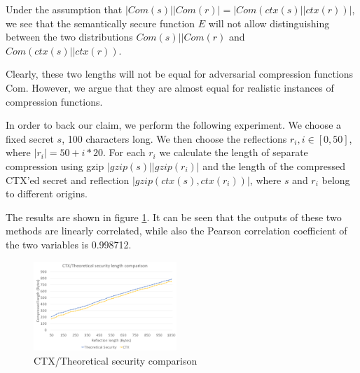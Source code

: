 Under the assumption that $|Com(s) || Com(r)| = |Com(ctx(s) || ctx(r))|$, we
see that the semantically secure function $E$ will not allow distinguishing
between the two distributions $Com(s) || Com(r)$ and $Com(ctx(s) || ctx(r))$.

Clearly, these two lengths will not be equal for adversarial compression
functions Com. However, we argue that they are almost equal for realistic
instances of compression functions.

In order to back our claim, we perform the following experiment. We choose a
fixed secret $s$, 100 characters long. We then choose the reflections $r_i,
i\in[0, 50]$, where $|r_i| = 50 + i*20$. For each $r_i$ we calculate the
length of separate compression using gzip $|gzip(s)||gzip(r_i)|$ and the length
of the compressed CTX'ed secret and reflection $|gzip(ctx(s), ctx(r_i))|$, where $s$
and $r_i$ belong to different origins.

The results are shown in figure \ref{fig:defense_experiment}. It can be seen
that the outputs of these two methods are linearly correlated, while also the
Pearson correlation coefficient of the two variables is 0.998712.

    \begin{figure}[thpb]
        \centering
            \includegraphics[width=0.48\textwidth]{defense_experiments/ctx_experiment.png}
        \caption{CTX/Theoretical security comparison}
        \label{fig:defense_experiment}
    \end{figure}
